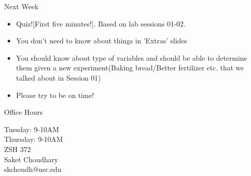 \documentclass[10pt]{beamer}
\begin{document}
\begin{frame}[fragile]{Next Week}
\begin{itemize}
\item Quiz![First five minutes!]. Based on lab sessions 01-02.
\item You don't need to know about things in 'Extras' slides
\item You should know about type of variables and should be able to determine them given a new experiment(Baking bread/Better fertilizer etc. that we talked about in Session 01) 
\item Please try to be on time!
\end{itemize}
\end{frame}

\begin{frame}[fragile]{Office Hours}
\Large \begin{center}Tuesday: 9-10AM\\
Thursday: 9-10AM\\
ZSH 372\\
\vspace*{2cm}
Saket Choudhary\\ 
skchoudh@usc.edu\\
\end{center}
\end{frame}
\end{document}
